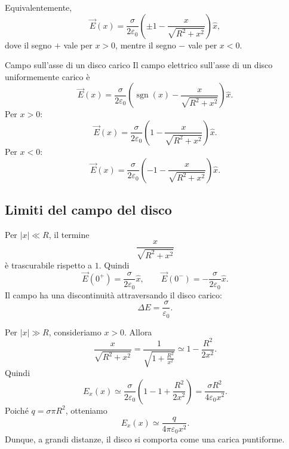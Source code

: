 \documentclass[a4paper]{article}
\begin{document}
Equivalentemente,
\[
    \vec{E}(x)=\frac{\sigma}{2\varepsilon_0}\left(\pm 1-\frac{x}{\sqrt{R^2+x^2}}\right)\hat{x},
\]
dove il segno \(+\) vale per \(x>0\), mentre il segno \(-\) vale per \(x<0\).

\begin{snippettheorem}{Campo sull'asse di un disco carico}
    Il campo elettrico sull'asse di un disco uniformemente carico è
    \[
        \vec{E}(x)=\frac{\sigma}{2\varepsilon_0}\left(\operatorname{sgn}(x)-\frac{x}{\sqrt{R^2+x^2}}\right)\hat{x}.
    \]
    Per \(x>0\):
    \[
        \vec{E}(x)=\frac{\sigma}{2\varepsilon_0}\left(1-\frac{x}{\sqrt{R^2+x^2}}\right)\hat{x}.
    \]
    Per \(x<0\):
    \[
        \vec{E}(x)=\frac{\sigma}{2\varepsilon_0}\left(-1-\frac{x}{\sqrt{R^2+x^2}}\right)\hat{x}.
    \]
\end{snippettheorem}

\subsection{Limiti del campo del disco}

Per \(|x|\ll R\), il termine
\[
    \frac{x}{\sqrt{R^2+x^2}}
\]
è trascurabile rispetto a \(1\). Quindi
\[
    \vec{E}(0^+)=\frac{\sigma}{2\varepsilon_0}\hat{x},
    \qquad
    \vec{E}(0^-)=-\frac{\sigma}{2\varepsilon_0}\hat{x}.
\]
Il campo ha una discontinuità attraversando il disco carico:
\[
    \Delta E=\frac{\sigma}{\varepsilon_0}.
\]

Per \(|x|\gg R\), consideriamo \(x>0\). Allora
\[
    \frac{x}{\sqrt{R^2+x^2}}
    =\frac{1}{\sqrt{1+\frac{R^2}{x^2}}}
    \simeq 1-\frac{R^2}{2x^2}.
\]
Quindi
\[
    E_x(x)\simeq\frac{\sigma}{2\varepsilon_0}\left(1-1+\frac{R^2}{2x^2}\right)
    =\frac{\sigma R^2}{4\varepsilon_0x^2}.
\]
Poiché \(q=\sigma\pi R^2\), otteniamo
\[
    E_x(x)\simeq\frac{q}{4\pi\varepsilon_0x^2}.
\]
Dunque, a grandi distanze, il disco si comporta come una carica puntiforme.

\begin{center}
\end{center}
\end{document}
